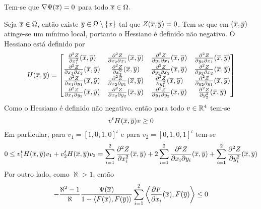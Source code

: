 \begin{proposicao}\label{gradiente_nulo}
	Tem-se que $\nabla \Psi(\overline{x}) = 0$ para todo $\overline{x} \in \Omega.$
\end{proposicao}

\begin{demonstracao}
	Seja $\overline{x} \in \Omega$, então existe $\overline{y} \in \Omega \setminus \{x\}$ tal que $Z(\overline{x},\overline{y}) = 0$. Tem-se que em $(\overline{x},\overline{y})$ atinge-se um mínimo local, portanto o Hessiano é definido não negativo. O Hessiano está definido por
	\begin{equation*}
		H(\overline{x},\overline{y}) = \left[ \begin{matrix}
		\frac{\partial^2 Z}{\partial x_1^2}(\overline{x},\overline{y}) & \frac{\partial^2 Z}{\partial x_2 \partial x_1}(\overline{x},\overline{y}) & \frac{\partial^2 Z}{\partial y_1 \partial x_1}(\overline{x},\overline{y}) & \frac{\partial^2 Z}{\partial y_2 \partial x_1}(\overline{x},\overline{y})\\ 
		\frac{\partial^2 Z}{\partial x_1 \partial x_2}(\overline{x},\overline{y}) & \frac{\partial^2 Z}{\partial x_2^2}(\overline{x},\overline{y}) & \frac{\partial^2 Z}{\partial y_1 \partial x_2}(\overline{x},\overline{y}) & \frac{\partial^2 Z}{\partial y_2 \partial x_2}(\overline{x},\overline{y})\\
		 \frac{\partial^2 Z}{\partial x_1 \partial y_1}(\overline{x},\overline{y}) & \frac{\partial^2 Z}{\partial x_2 \partial y_1}(\overline{x},\overline{y}) & \frac{\partial^2 Z}{\partial y_1^2}(\overline{x},\overline{y}) & \frac{\partial^2 Z}{\partial y_2 \partial y_1}(\overline{x},\overline{y})\\
		  \frac{\partial^2 Z}{\partial x_1 \partial y_2}(\overline{x},\overline{y}) & \frac{\partial^2 Z}{\partial x_2 \partial y_2}(\overline{x},\overline{y}) & \frac{\partial^2 Z}{\partial y_1 \partial y_2}(\overline{x},\overline{y}) & \frac{\partial^2 Z}{\partial y_2^2}(\overline{x},\overline{y})
		\end{matrix} \right]
	\end{equation*}	
	Como o Hessiano é definido não negativo. então para todo $v \in \mathbb{R}^4$ tem-se
	\begin{equation*}
		v^t H(\overline{x},\overline{y}) v \geq 0
	\end{equation*}	
	Em particular, para $v_1 = [1,0,1,0]^t$ e para $v_2 = [0,1,0,1]^t$ tem-se
	\begin{equation*}
		0 \leq v_1^t H(\overline{x},\overline{y}) v_1 + v_2^t H(\overline{x},\overline{y}) v_ 2 = \sum_{i=1}^2 \frac{\partial^2 Z}{\partial x_i^2}(\overline{x},\overline{y}) + 2 \sum_{i=1}^2 \frac{\partial^2 Z}{\partial x_i \partial y_i}(\overline{x},\overline{y}) + \sum_{i=1}^2 \frac{\partial^2 Z}{\partial y_i^2}(\overline{x},\overline{y})
	\end{equation*}	
	Por outro lado, como $\aleph > 1$, então
	\begin{equation*}
		- \frac{\aleph^2 - 1}{\aleph} \frac{\Psi(\xb)}{1 - \langle F(\xb), F(\yb) \rangle} \sum_{i=1}^2 \left\langle \frac{\partial F}{\partial x_i}(\xb), F(\yb) \right\rangle \leq 0

\end{equation*}
\end{demonstracao}
